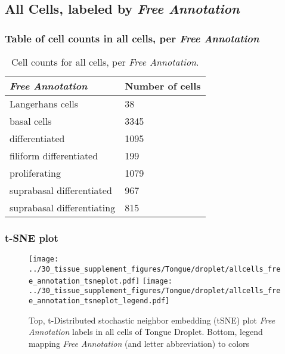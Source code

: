 \clearpage

\subsection{All Cells, labeled by \emph{Free Annotation}}
\subsubsection{Table of cell counts in all cells, per \emph{Free Annotation}}\begin{table}[h]
\centering
\label{my-label}
\begin{tabular}{@{}ll@{}}
\toprule

\emph{Free Annotation}& Number of cells \\ \midrule
Langerhans cells & 38 \\

basal cells & 3345 \\

differentiated & 1095 \\

filiform differentiated & 199 \\

proliferating & 1079 \\

suprabasal differentiated & 967 \\

suprabasal differentiating & 815 \\
\bottomrule
\end{tabular}
\caption{Cell counts for all cells, per \emph{Free Annotation}.}
\end{table}

\clearpage
\subsubsection{t-SNE plot}
\begin{figure}[h]
\centering
\texttt{[image: ../30\_tissue\_supplement\_figures/Tongue/droplet/allcells\_free\_annotation\_tsneplot.pdf]}
\texttt{[image: ../30\_tissue\_supplement\_figures/Tongue/droplet/allcells\_free\_annotation\_tsneplot\_legend.pdf]}
\caption{Top, t-Distributed stochastic neighbor embedding (tSNE) plot  \emph{Free Annotation} labels in all cells of Tongue Droplet. Bottom, legend mapping \emph{Free Annotation} (and letter abbreviation) to colors}
\end{figure}


\clearpage

